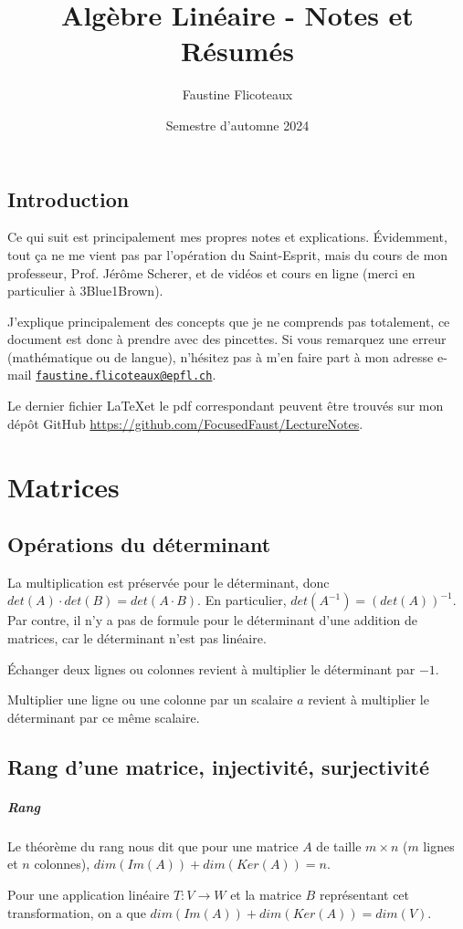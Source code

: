 \documentclass[10pt,a4paper]{book}
\title{Algèbre Linéaire - Notes et Résumés}
\author{Faustine Flicoteaux}
\date{Semestre d'automne 2024}
\begin{document}
\maketitle
\tableofcontents
\newpage


\section*{Introduction}
Ce qui suit est principalement mes propres notes et explications. Évidemment, tout ça ne me vient pas par l'opération du Saint-Esprit, mais du cours de mon professeur, Prof. Jérôme Scherer, et de vidéos et cours en ligne (merci en particulier à 3Blue1Brown).\par 
J'explique principalement des concepts que je ne comprends pas totalement, ce document est donc à prendre avec des pincettes. Si vous remarquez une erreur (mathématique ou de langue), n'hésitez pas à m'en faire part à mon adresse e-mail \texttt{\href{mailto:faustine.flicoteaux@epfl.ch}{faustine.flicoteaux@epfl.ch}}.\par 
Le dernier fichier \LaTeX et le pdf correspondant peuvent être trouvés sur mon dépôt GitHub \url{https://github.com/FocusedFaust/LectureNotes}.

\chapter{Matrices}
\section{Opérations du déterminant}
La multiplication est préservée pour le déterminant, donc $det(A)\cdot det(B) = det(A\cdot B)$. En particulier, $det(A^{-1}) = (det(A))^{-1}$. Par contre, il n'y a pas de formule pour le déterminant d'une addition de matrices, car le déterminant n'est pas linéaire.\par 
Échanger deux lignes ou colonnes revient à multiplier le déterminant par $-1$.\par 
Multiplier une ligne ou une colonne par un scalaire $a$ revient à multiplier le déterminant par ce même scalaire.

\section{Rang d'une matrice, injectivité, surjectivité}
\paragraph{Rang}
Le théorème du rang nous dit que pour une matrice $A$ de taille $m\times n$ ($m$ lignes et $n$ colonnes), $dim(Im(A))+dim(Ker(A))=n$. \par 
Pour une application linéaire $T:V\to W$ et la matrice $B$ représentant cet transformation, on a que $dim(Im(A))+dim(Ker(A))=dim(V)$.
\end{document}
